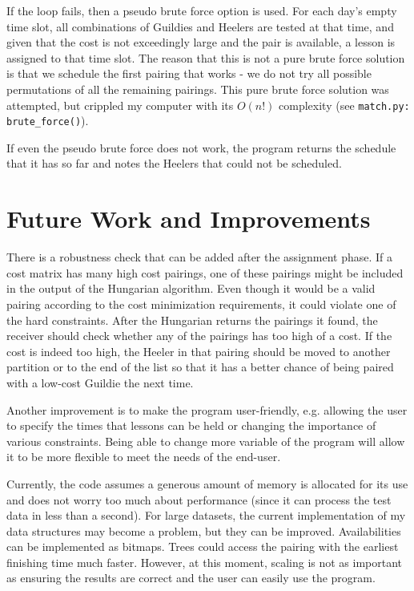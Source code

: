 \documentclass[letterpaper]{article}
\begin{document}
If the loop fails, then a pseudo brute force option is used. For each day's empty time slot, all combinations of Guildies and
Heelers are tested at that time, and given that the cost is not exceedingly large and the pair is available, a lesson is
assigned to that time slot. The reason that this is not a pure brute force solution is that we schedule the first
pairing that works - we do not try all possible permutations of all the remaining pairings. This pure brute force
solution was attempted, but crippled my computer with its $O(n!)$ complexity (see \texttt{match.py:
brute\_force()}).

If even the pseudo brute force does not work, the program returns the schedule that it has so far and notes the Heelers
that could not be scheduled.

\section{Future Work and Improvements}
There is a robustness check that can be added after the assignment phase. If a cost matrix has many high cost
pairings, one of these pairings might be included in the output of the Hungarian algorithm. Even though it would be a
valid pairing according to the cost minimization requirements, it could violate one of the hard constraints. After the
Hungarian returns the pairings it found, the receiver should check whether any of the pairings has too high of a cost.
If the cost is indeed too high, the Heeler in that pairing should be moved to another partition or to the end of the
list so that it has a better chance of being paired with a low-cost Guildie the next time. 

Another improvement is to make the program user-friendly, e.g. allowing the user to specify the times that
lessons can be held or changing the importance of various constraints. Being able to change more variable of the program
will allow it to be more flexible to meet the needs of the end-user. 

Currently, the code assumes a generous amount of memory is allocated for its use and does not worry too much about
performance (since it can process the test data in less than a second). For large datasets, the current implementation
of my data structures may become a problem, but they can be improved. Availabilities can be implemented as bitmaps.
Trees could access the pairing with the earliest finishing time much faster. However, at this moment, scaling is not as
important as ensuring the results are correct and the user can easily use the program.
\end{document}
